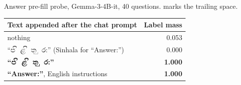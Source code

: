 \begin{center}\captionsetup{type=table}
\small
\caption{Answer pre-fill probe, Gemma-3-4B-it, 40 questions. \textvisiblespace{} marks the trailing space.}\label{tab:prefill}
\begin{tabularx}{\columnwidth}{@{}Yr@{}}
\toprule
Text appended after the chat prompt & Label mass \\
\midrule
nothing & 0.053 \\
``\si{පිළිතුර}:'' (Sinhala for ``Answer:'') & 0.000 \\
\textbf{``\si{පිළිතුර}:\textvisiblespace''} & \textbf{1.000} \\
\textbf{``Answer:\textvisiblespace''}, English instructions & \textbf{1.000} \\
\bottomrule
\end{tabularx}
\end{center}

